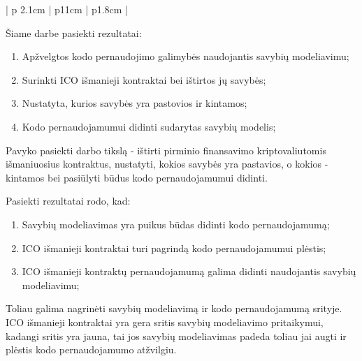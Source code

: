 \documentclass{VUMIFPSkursinis}
\begin{document}
\begin{center}
\begin{longtable}[H]{| p {2.1cm} | p{11cm} | p{1.8cm} |}
		
\end{longtable}
    \label{table:validacija}

\end{center}



Šiame darbe pasiekti rezultatai:
\begin{enumerate}

\item Apžvelgtos kodo pernaudojimo galimybės naudojantis savybių modeliavimu;
\item Surinkti ICO išmanieji kontraktai bei ištirtos jų savybės;
\item Nustatyta, kurios savybės yra pastovios ir kintamos;
\item Kodo pernaudojamumui didinti sudarytas savybių modelis;

\end{enumerate}

Pavyko pasiekti darbo tikslą - ištirti pirminio finansavimo kriptovaliutomis išmaniuosius kontraktus, nustatyti, kokios savybės yra pastavios, o kokios - kintamos bei pasiūlyti būdus kodo pernaudojamumui didinti.


Pasiekti rezultatai rodo, kad:
\begin{enumerate}
\item Savybių modeliavimas yra puikus būdas didinti kodo pernaudojamumą;
\item ICO išmanieji kontraktai turi pagrindą kodo pernaudojamumui plėstis;
\item ICO išmanieji kontraktų pernaudojamumą galima didinti naudojantis savybių modeliavimu;
\end{enumerate}

Toliau galima nagrinėti savybių modeliavimą ir kodo pernaudojamumą srityje. ICO išmanieji kontraktai yra gera sritis savybių modeliavimo pritaikymui, kadangi sritis yra jauna, tai jos savybių modeliavimas padeda toliau jai augti ir plėstis kodo pernaudojamumo atžvilgiu.



\printbibliography[heading=bibintoc] %
\end{document}
